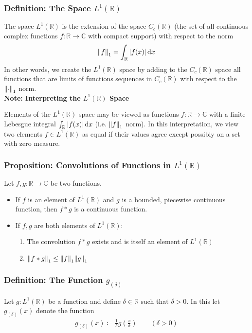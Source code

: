\documentclass[11pt, a4paper]{article}
\newcommand{\diff}{\mathop{}\!\mathrm{d}} %
\newcommand{\R}{\mathbb{R}} %
\newcommand{\C}{\mathbb{C}} %
\begin{document}
\subsubsection{Definition: The Space $ L^1(\R) $}
The space $ L^1(\R) $ is the extension of the space $ C_{c}(\R) $ (the set of all continuous complex functions $ f:\R \to \C $ with compact support) with respect to the norm
\begin{align*}
	\norm{f}_{1} = \int_{\R}\abs{f(x)} \diff x
\end{align*}
In other words, we create the $ L^1(\R) $ space by adding to the $ C_c(\R) $ space all functions that are limits of functions sequences in $ C_c(\R) $ with respect to the $ \norm{\cdot}_1 $ norm. \\

\textbf{Note: Interpreting the $ L^1(\R) $ Space}\vspace{1mm}

Elements of the $ L^1(\R) $ space may be viewed as functions $ f : \R \to \C $ with a finite Lebesgue integral $ \int_{\R}\abs{f(x)} \diff x $ (i.e. $ \norm{f}_1  $ norm). In this interpretation, we view two elements $ f \in  L^1(\R) $ as equal if their values agree except possibly on a set with zero measure. 

\subsubsection{Proposition: Convolutions of Functions in $ L^1(\R) $}
Let $ f, g: \R \to \C $ be two functions.
\begin{itemize}
	\item If $ f $ is an element of $ L^1(\R) $ and $ g $ is a bounded, piecewise continuous function, then $ f*g $ is a continuous function.
	
	\item If $ f, g $ are both elements of $ L^1(\R) $:
	\begin{enumerate}
		\item The convolution $ f * g $ exists and is itself an element of $ L^1(\R) $
		\item $ \displaystyle{\norm{f*g}_1 \leq \norm{f}_1 \norm{g}_1} $
	\end{enumerate}
	

\end{itemize}

\subsubsection{Definition: The Function $ g_{(\delta)} $}
Let $ g:L^1(\R) $ be a function and define $ \delta \in \R $ such that $ \delta > 0 $. In this let $ g_{(\delta)}(x) $ denote the function
\begin{align*}
	g_{(\delta)}(x) \coloneqq \frac{1}{\delta} g\left(\frac{x}{\delta}\right) \qquad (\delta > 0)
\end{align*}
\end{document}
